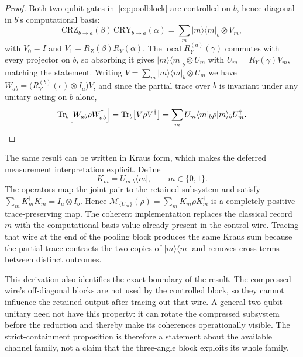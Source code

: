 \documentclass[conference]{IEEEtran}
\begin{document}
\begin{proof}
Both two-qubit gates in~\eqref{eq:poolblock} are controlled on $b$, hence diagonal in $b$'s computational basis:
\begin{equation}
\text{CRZ}_{b \to a}(\beta)\,\text{CRY}_{b \to a}(\alpha) = \sum_{m} |m\rangle\langle m|_b \otimes V_m,
\end{equation}
with $V_0 = I$ and $V_1 = R_Z(\beta) R_Y(\alpha)$. The local $R_Y^{(a)}(\gamma)$ commutes with every projector on $b$, so absorbing it gives $|m\rangle\langle m|_b \otimes U_m$ with $U_m = R_Y(\gamma) V_m$, matching the statement. Writing $V = \sum_m |m\rangle\langle m|_b \otimes U_m$ we have $W_{ab} = \big(R_Y^{(b)}(\epsilon) \otimes I_a\big) V$, and since the partial trace over $b$ is invariant under any unitary acting on $b$ alone,
\begin{equation}
\mathrm{Tr}_b\!\left[W_{ab} \rho W_{ab}^{\dagger}\right] = \mathrm{Tr}_b\!\left[V \rho V^{\dagger}\right] = \sum_m U_m \langle m|_b \rho |m\rangle_b U_m^{\dagger}. \qedhere
\end{equation}
\end{proof}

The same result can be written in Kraus form, which makes the deferred
measurement interpretation explicit. Define
\begin{equation}
K_m=U_m\,{}_b\!\langle m|,\qquad m\in\{0,1\}.
\label{eq:pool-kraus}
\end{equation}
The operators map the joint pair to the retained subsystem and satisfy
$\sum_m K_m^{\dagger}K_m=I_a\otimes I_b$. Hence
$\mathcal{M}_{\{U_m\}}(\rho)=\sum_mK_m\rho K_m^{\dagger}$ is a completely
positive trace-preserving map. The coherent implementation replaces the
classical record $m$ with the computational-basis value already present in
the control wire. Tracing that wire at the end of the pooling block produces
the same Kraus sum because the partial trace contracts the two copies of
$|m\rangle\langle m|$ and removes cross terms between distinct outcomes.

This derivation also identifies the exact boundary of the result. The
compressed wire's off-diagonal blocks are not used by the controlled block,
so they cannot influence the retained output after tracing out that wire. A
general two-qubit unitary need not have this property: it can rotate the
compressed subsystem before the reduction and thereby make its coherences
operationally visible. The strict-containment proposition is therefore a
statement about the available channel family, not a claim that the
three-angle block exploits its whole family.
\end{document}
